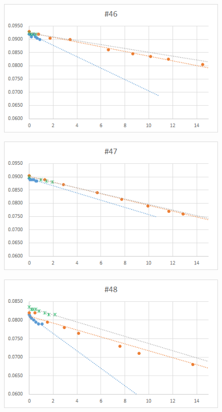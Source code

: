 \documentclass[12pt,a4paper]{jarticle}
\begin{document}
\begin{figure}[htbp]
  \centering
     \includegraphics[width=120mm]{vol_046.png}
\end{figure}
\begin{figure}[htbp]
  \centering
     \includegraphics[width=120mm]{vol_047.png}
\end{figure}
\begin{figure}[htbp]
  \centering
     \includegraphics[width=120mm]{vol_048.png}
\end{figure}
\end{document}
